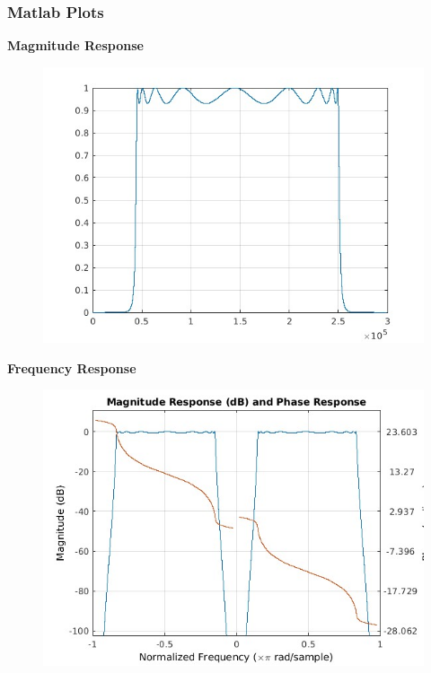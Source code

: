 \documentclass{article}
\begin{document}
\subsubsection{Matlab Plots}
\textbf{Magmitude Response}
\begin{figure}[H]
\hspace*{-2.5cm}
    \centering
    \includegraphics[scale = 0.5]{bpf_cheby_mag.jpg}
    \label{fig:my_label}
\end{figure}

\textbf{Frequency Response}
\begin{figure}[H]
\hspace*{-2.5cm}
    \centering
    \includegraphics[scale = 0.5]{bpf_cheby_magphase.jpg}
    \label{fig:my_label}
\end{figure}
\end{document}
